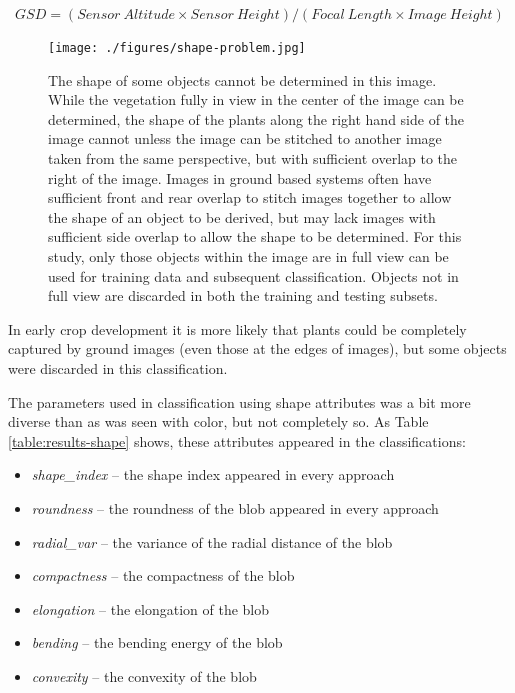 \documentclass[letterpaper]{report}
\begin{document}
\begin{equation}
\label{eqn:gsd}
GSD = (Sensor\ Altitude \times Sensor\ Height) / (Focal\ Length \times Image\ Height)
\end{equation}

 \begin{figure}[H]
	\centering
	\texttt{[image: ./figures/shape-problem.jpg]}
	\caption[Shape of some objects cannot be determined]{The shape of some objects cannot be determined in this image. While the vegetation fully in view in the center of the image can be determined, the shape of the plants along the right hand side of the image cannot unless the image can be stitched to another image taken from the same perspective, but with sufficient overlap to the right of the image. Images in ground based systems often have sufficient front and rear overlap to stitch images together to allow the shape of an object to be derived, but may lack images with sufficient side overlap to allow the shape to be determined. For this study, only those objects within the image are in full view can be used for training data and subsequent classification. Objects not in full view are discarded in both the training and testing subsets.}
	\label{fig:shape-problem}
\end{figure}

In early crop development it is more likely that plants could be completely captured by ground images (even those at the edges of images), but some objects were discarded in this classification.

The parameters used in classification using shape attributes was a bit more diverse than as was seen with color, but not completely so. As Table \ref{table:results-shape} shows, these attributes appeared in the classifications:
\begin{itemize}
	\item{\textit{shape\_index} -- the shape index appeared in every approach}
	\item{\textit{roundness} -- the roundness of the blob appeared in every approach}
	\item{\textit{radial\_var} -- the variance of the radial distance of the blob}
	\item{\textit{compactness} -- the compactness of the blob}
	\item{\textit{elongation} -- the elongation of the blob}
	\item{\textit{bending} -- the bending energy of the blob}
	\item{\textit{convexity} -- the convexity of the blob}
\end{itemize}
\end{document}
